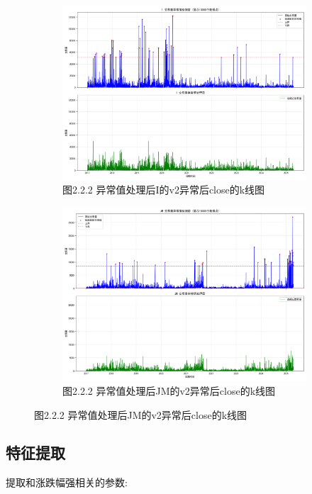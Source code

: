 \documentclass[a4paper,12pt]{ctexart}
\begin{document}
\begin{enumerate}
\begin{figure}[H]
\begin{subfigure}[t]{0.4\textwidth}
    \includegraphics[width=\textwidth]{./v2/v3/I.png}
    \caption*{图2.2.2 异常值处理后I的v2异常后close的k线图}
  \end{subfigure}
  \hfill
  \begin{subfigure}[t]{0.4\textwidth}
    \includegraphics[width=\textwidth]{./v2/v3/JM.png}
    \caption*{图2.2.2 异常值处理后JM的v2异常后close的k线图}
  \end{subfigure}
\end{figure}
\end{enumerate}
\fi

\newpage
\subsection{特征提取}
提取和涨跌幅强相关的参数:
\end{document}
